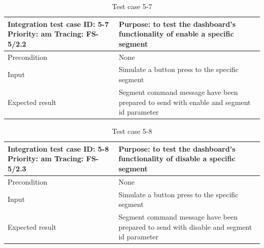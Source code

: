 \begin{table}[H]
	\caption{Test case 5-7}
	\label{table:TCase-FS5-7}
	\begin{center}
		\renewcommand{\arraystretch}{1.8}
		\begin{tabu} 
			to 0.9 \textwidth
			{  X[0.4, c] X[c] }
			\toprule
			Integration test case ID: 5-7 \newline Priority: am \newline Tracing: FS-5/2.2 & Purpose: to test the dashboard's functionality of enable a specific segment             \\ \midrule
			Precondition                                                                   & None                                                                                    \\
			Input                                                                          & Simulate a button press to the specific segment                                         \\
			Expected result                                                                & Segment command message have been prepared to send with enable and segment id parameter \\ \bottomrule
		\end{tabu}
	\end{center}
\end{table}

\begin{table}[H]
	\caption{Test case 5-8}
	\label{table:TCase-FS5-8}
	\begin{center}
		\renewcommand{\arraystretch}{1.8}
		\begin{tabu} 
			to 0.9 \textwidth
			{  X[0.4, c] X[c] }
			\toprule
			Integration test case ID: 5-8 \newline Priority: am \newline Tracing: FS-5/2.3 & Purpose: to test the dashboard's functionality of disable a specific segment             \\ \midrule
			Precondition                                                                   & None                                                                                     \\
			Input                                                                          & Simulate a button press to the specific segment                                          \\
			Expected result                                                                & Segment command message have been prepared to send with disable and segment id parameter \\ \bottomrule
		\end{tabu}
	\end{center}
\end{table}





